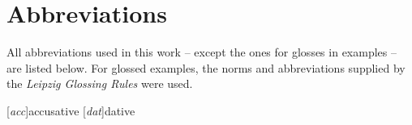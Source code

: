 \chapter{Abbreviations}



All abbreviations used in this work -- except the ones for glosses in examples -- are listed below. For glossed examples, the norms and abbreviations supplied by the  \emph{Leipzig Glossing Rules} \citep[cf.][]{LeipzigGloss15a} were used.



\begin{multicols}{2}
\setlength{\columnseprule}{.5pt}
\begin{acronym}[n--sg--strong]
%
	[\textit{acc}]{accusative}
%
%
%
	[\textit{dat}]{dative}
%
%
%
%
%
%
%
%
%
%
%
%
%
%
%
%
%
%
%
%
\end{acronym}
\end{multicols}
